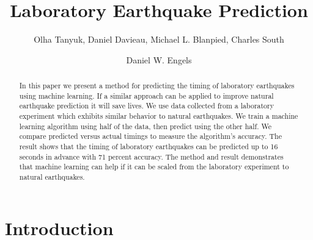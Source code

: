 \documentclass[]{llncs}
\begin{document}

\title{Laboratory Earthquake Prediction}

\author{Olha Tanyuk, Daniel Davieau, Michael L. Blanpied, Charles South \and Daniel W. Engels}



\maketitle




\begin{abstract}
In this paper we present a method for predicting the timing of laboratory earthquakes using machine learning. If a similar approach can be applied to improve natural earthquake prediction it will save lives. We use data collected from a laboratory experiment which exhibits similar behavior to natural earthquakes. We train a machine learning algorithm using half of the data, then predict using the other half. We compare predicted versus actual timings to measure the algorithm's accuracy. The result shows that the timing of laboratory earthquakes can be predicted up to 16 seconds in advance with 71 percent accuracy. The method and result demonstrates that machine learning can help if it can be scaled from the laboratory experiment to natural earthquakes. \par
\end{abstract}

\section{Introduction}
\end{document}
